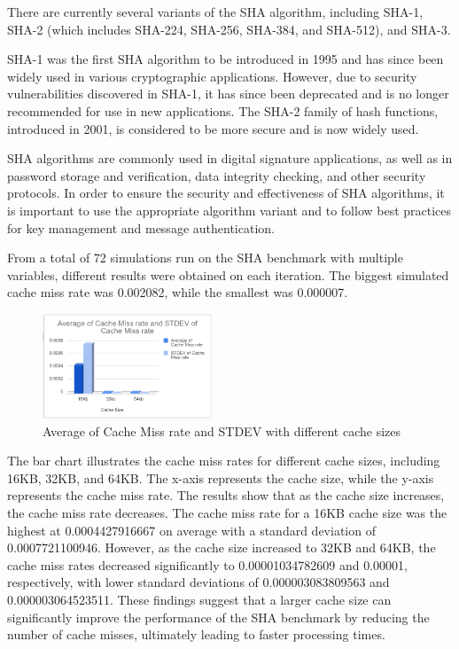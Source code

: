 \documentclass[conference]{IEEEtran}
\begin{document}
There are currently several variants of the SHA algorithm, including SHA-1, SHA-2 (which includes SHA-224, SHA-256, SHA-384, and SHA-512), and SHA-3.

SHA-1 was the first SHA algorithm to be introduced in 1995 and has since been widely used in various cryptographic applications. However, due to security vulnerabilities discovered in SHA-1, it has since been deprecated and is no longer recommended for use in new applications. The SHA-2 family of hash functions, introduced in 2001, is considered to be more secure and is now widely used.

SHA algorithms are commonly used in digital signature applications, as well as in password storage and verification, data integrity checking, and other security protocols. In order to ensure the security and effectiveness of SHA algorithms, it is important to use the appropriate algorithm variant and to follow best practices for key management and message authentication.

From a total of 72 simulations run on the SHA benchmark with multiple variables, different results were obtained on each iteration. The biggest simulated cache miss rate was 0.002082, while the smallest was 0.000007.

\begin{figure}[H]
    \centering
    \includegraphics[width=0.45\textwidth]{sha/sha_avg_cachesize.png}
    \caption{Average of Cache Miss rate and STDEV with different cache sizes}
\end{figure}

The bar chart illustrates the cache miss rates for different cache sizes, including 16KB, 32KB, and 64KB. The x-axis represents the cache size, while the y-axis represents the cache miss rate. The results show that as the cache size increases, the cache miss rate decreases. The cache miss rate for a 16KB cache size was the highest at 0.0004427916667 on average with a standard deviation of 0.0007721100946. However, as the cache size increased to 32KB and 64KB, the cache miss rates decreased significantly to 0.00001034782609 and 0.00001, respectively, with lower standard deviations of 0.000003083809563 and 0.000003064523511. These findings suggest that a larger cache size can significantly improve the performance of the SHA benchmark by reducing the number of cache misses, ultimately leading to faster processing times.
\end{document}

